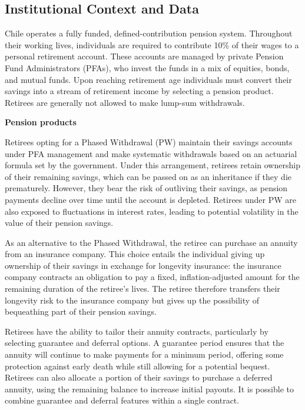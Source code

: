 \documentclass[12pt]{article}
\theoremstyle{plain}
\theoremstyle{plain}
\begin{document}
 




\subsection*{Institutional Context and Data}\label{sec: context and data}

Chile operates a fully funded, defined-contribution pension system. Throughout their working lives, individuals are required to contribute 10\% of their wages to a personal retirement account. These accounts are managed by private Pension Fund Administrators (PFAs), who invest the funds in a mix of equities, bonds, and mutual funds. Upon reaching retirement age individuals must convert their savings into a stream of retirement income by selecting a pension product. Retirees are generally not allowed to make lump-sum withdrawals.


\textbf{Pension products} 

Retirees opting for a Phased Withdrawal (PW) maintain their savings accounts under PFA management and make systematic withdrawals based on an actuarial formula set by the government.  Under this arrangement, retirees retain ownership of their remaining savings, which can be passed on as an inheritance if they die prematurely. However, they bear the risk of outliving their savings, as pension payments decline over time until the account is depleted. Retirees under PW are also exposed to fluctuations in interest rates, leading to potential volatility in the value of their pension savings.

As an alternative to the Phased Withdrawal, the retiree can purchase an annuity from an insurance company. This choice entails the individual giving up ownership of their savings in exchange for longevity insurance: the insurance company contracts an obligation to pay a fixed, inflation-adjusted amount for the remaining duration of the retiree’s lives. The retiree therefore transfers their longevity risk to the insurance company but gives up the possibility of bequeathing part of their pension savings.

Retirees have the ability to tailor their annuity contracts, particularly by selecting guarantee and deferral options. A guarantee period ensures that the annuity will continue to make payments for a minimum period, offering some protection against early death while still allowing for a potential bequest. Retirees can also allocate a portion of their savings to purchase a deferred annuity, using the remaining balance to increase initial payouts. It is possible to combine guarantee and deferral features within a single contract.
\end{document}
